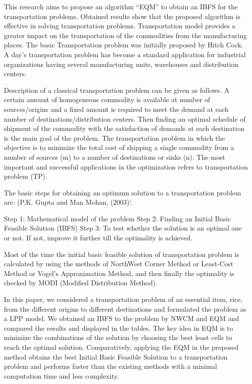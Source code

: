 \documentclass{article}
\begin{document}
This research aims to propose an algorithm “EQM” to obtain an IBFS for the transportation problems. Obtained results show that the proposed algorithm is effective in solving transportation problems. Transportation model provides a greater impact on the
transportation of the commodities from the manufacturing places. The basic Transportation problem was initially proposed by Hitch Cock. A day’s transportation problem has become a standard application for industrial organizations having several manufacturing units, warehouses and distribution centers.

Description of a classical transportation problem can be given as follows. A certain amount of homogeneous
commodity is available at number of sources/origins and a fixed amount is required to meet the demand at each number of destinations/distribution centers. Then finding an optimal schedule of shipment of the commodity with the satisfaction of demands at each destination is the main goal of the problem. The
transportation problem in which the objective is to minimize the total cost of shipping a single commodity from a number of sources (m) to a number of destinations or sinks (n). The most important and successful applications in the optimization refers to transportation problem (TP).

The basic steps for obtaining an optimum solution to a transportation problem are: (P.K. Gupta and Man Mohan, (2003)`.

Step 1: Mathematical model of the problem
Step 2: Finding an Initial Basic Feasible Solution (IBFS)
Step 3: To test whether the solution is an
optimal one or not. If not, improve it further till the optimality is achieved. 

Most of the time the initial basic feasible solution of transportation problem is calculated by using the methods of NorthWest Corner Method or Least-Cost Method or Vogel’s Approximation Method, and then finally the optimality is checked by MODI (Modified Distribution Method).

In this paper, we considered a transportation problem of an essential item, rice, from the different origins to different destinations and formulated the problem as a LPP model. We obtained an IBFS to the problem by NWCM
and EQM and compared the results and displayed in the tables. The key idea in EQM is to minimize the combinations of the solution by choosing the best least cells to reach the optimal solution. Comparatively,
applying the EQM in the proposed method obtains the best Initial Basic Feasible Solution to a transportation problem and performs faster than the existing methods with a minimal computation time and less complexity.
\end{document}

